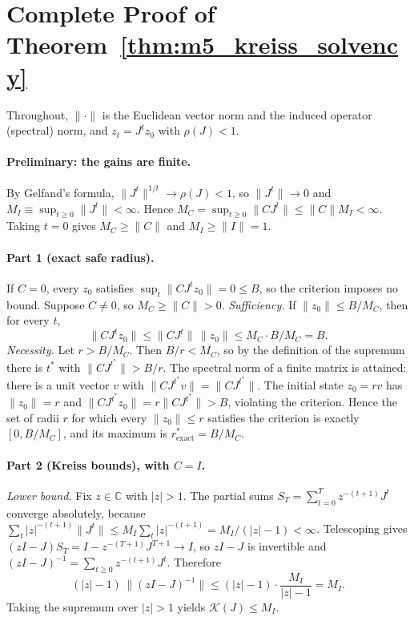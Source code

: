 \documentclass[12pt]{article}
\theoremstyle{definition}
\theoremstyle{remark}
\begin{document}
\section{Complete Proof of Theorem~\ref{thm:m5_kreiss_solvency}}
\label{ia:kreiss_proof}

Throughout, $\|\cdot\|$ is the Euclidean vector norm and the induced operator (spectral) norm, and $z_t=J^tz_0$ with $\rho(J)<1$.

\paragraph{Preliminary: the gains are finite.}
By Gelfand's formula, $\|J^t\|^{1/t}\to\rho(J)<1$, so $\|J^t\|\to0$ and $M_I\equiv\sup_{t\ge0}\|J^t\|<\infty$. Hence $M_C=\sup_{t\ge0}\|CJ^t\|\le\|C\|M_I<\infty$. Taking $t=0$ gives $M_C\ge\|C\|$ and $M_I\ge\|I\|=1$.

\paragraph{Part 1 (exact safe radius).}
If $C=0$, every $z_0$ satisfies $\sup_t\|CJ^tz_0\|=0\le B$, so the criterion imposes no bound. Suppose $C\neq0$, so $M_C\ge\|C\|>0$.
\emph{Sufficiency.} If $\|z_0\|\le B/M_C$, then for every $t$,
\begin{equation}
\|CJ^tz_0\|\le\|CJ^t\|\,\|z_0\|\le M_C\cdot B/M_C=B .
\end{equation}
\emph{Necessity.} Let $r>B/M_C$. Then $B/r<M_C$, so by the definition of the supremum there is $t^*$ with $\|CJ^{t^*}\|>B/r$. The spectral norm of a finite matrix is attained: there is a unit vector $v$ with $\|CJ^{t^*}v\|=\|CJ^{t^*}\|$. The initial state $z_0=rv$ has $\|z_0\|=r$ and $\|CJ^{t^*}z_0\|=r\|CJ^{t^*}\|>B$, violating the criterion. Hence the set of radii $r$ for which every $\|z_0\|\le r$ satisfies the criterion is exactly $[0,B/M_C]$, and its maximum is $r^*_{\text{exact}}=B/M_C$.

\paragraph{Part 2 (Kreiss bounds), with $C=I$.}
\emph{Lower bound.} Fix $z\in\mathbb{C}$ with $|z|>1$. The partial sums $S_T=\sum_{t=0}^{T}z^{-(t+1)}J^t$ converge absolutely, because $\sum_t|z|^{-(t+1)}\|J^t\|\le M_I\sum_t|z|^{-(t+1)}=M_I/(|z|-1)<\infty$. Telescoping gives $(zI-J)S_T=I-z^{-(T+1)}J^{T+1}\to I$, so $zI-J$ is invertible and $(zI-J)^{-1}=\sum_{t\ge0}z^{-(t+1)}J^t$. Therefore
\begin{equation}
(|z|-1)\,\|(zI-J)^{-1}\|\le(|z|-1)\cdot\frac{M_I}{|z|-1}=M_I .
\end{equation}
Taking the supremum over $|z|>1$ yields $\mathcal{K}(J)\le M_I$.
\end{document}
